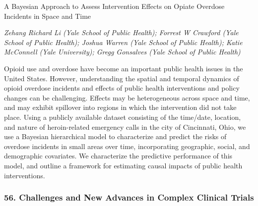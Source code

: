 \begin{itemize}
A Bayesian Approach to Assess Intervention Effects on Opiate Overdose Incidents in Space and Time

\emph{\footnotesize Zehang Richard Li (Yale School of Public Health); Forrest W Crawford (Yale School of Public Health); Joshua Warren (Yale School of Public Health); Katie McConnell  (Yale University); Gregg Gonsalves  (Yale School of Public Health)}

Opioid use and overdose have become an important public health issues in the United States. However, understanding the spatial and temporal dynamics of opioid overdose incidents and effects of public health interventions and policy changes can be challenging. Effects may be heterogeneous across space and time, and may exhibit spillover into regions in which the intervention did not take place. Using a publicly available dataset consisting of the time/date, location, and nature of heroin-related emergency calls in the city of Cincinnati, Ohio, we use a Bayesian hierarchical model to characterize and predict the risks of overdose incidents in small areas over time, incorporating geographic, social, and demographic covariates. We characterize the predictive performance of this model, and outline a framework for estimating causal impacts of public health interventions.

\end{itemize}

\subsubsection*{56. Challenges and New Advances in Complex Clinical Trials}

